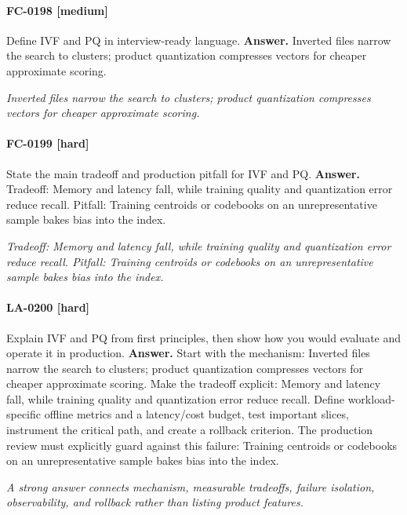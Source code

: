 \paragraph{FC-0198 [medium]} Define IVF and PQ in interview-ready language.
\noindent\textbf{Answer.} Inverted files narrow the search to clusters; product quantization compresses vectors for cheaper approximate scoring.
\par\textit{Inverted files narrow the search to clusters; product quantization compresses vectors for cheaper approximate scoring.}
\paragraph{FC-0199 [hard]} State the main tradeoff and production pitfall for IVF and PQ.
\noindent\textbf{Answer.} Tradeoff: Memory and latency fall, while training quality and quantization error reduce recall. Pitfall: Training centroids or codebooks on an unrepresentative sample bakes bias into the index.
\par\textit{Tradeoff: Memory and latency fall, while training quality and quantization error reduce recall. Pitfall: Training centroids or codebooks on an unrepresentative sample bakes bias into the index.}
\paragraph{LA-0200 [hard]} Explain IVF and PQ from first principles, then show how you would evaluate and operate it in production.
\noindent\textbf{Answer.} Start with the mechanism: Inverted files narrow the search to clusters; product quantization compresses vectors for cheaper approximate scoring. Make the tradeoff explicit: Memory and latency fall, while training quality and quantization error reduce recall. Define workload-specific offline metrics and a latency/cost budget, test important slices, instrument the critical path, and create a rollback criterion. The production review must explicitly guard against this failure: Training centroids or codebooks on an unrepresentative sample bakes bias into the index.
\par\textit{A strong answer connects mechanism, measurable tradeoffs, failure isolation, observability, and rollback rather than listing product features.}
